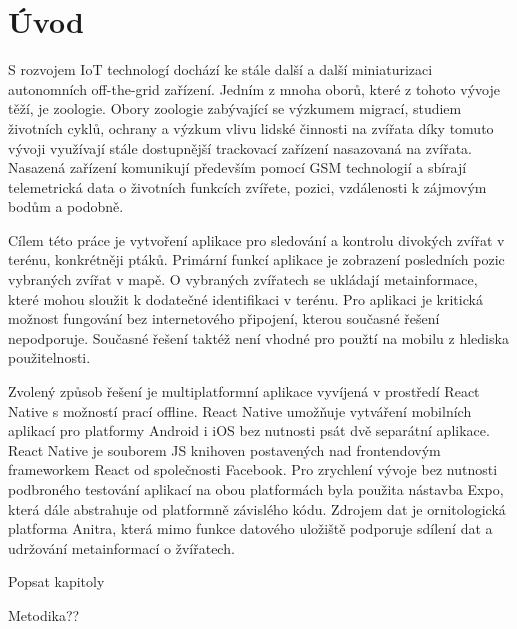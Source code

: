 \chapter*{Úvod}

S rozvojem IoT technologí dochází ke stále další a další miniaturizaci autonomních off-the-grid zařízení. Jedním z mnoha oborů, které z tohoto vývoje těží, je zoologie. Obory zoologie zabývající se výzkumem migrací, studiem životních cyklů, ochrany a výzkum vlivu lidské činnosti na zvířata díky tomuto vývoji využívají stále dostupnější trackovací zařízení nasazovaná na zvířata. Nasazená zařízení komunikují především pomocí GSM technologií a sbírají telemetrická data o životních funkcích zvířete, pozici, vzdálenosti k zájmovým bodům a podobně.


Cílem této práce je vytvoření aplikace pro sledování a kontrolu divokých zvířat v terénu, konkrétněji ptáků. Primární funkcí aplikace je zobrazení posledních pozic vybraných zvířat v mapě. O vybraných zvířatech se ukládají metainformace, které mohou sloužit k dodatečné identifikaci v terénu. Pro aplikaci je kritická možnost fungování bez internetového připojení, kterou současné řešení nepodporuje. Současné řešení taktéž není vhodné pro použtí na mobilu z hlediska použitelnosti.

Zvolený způsob řešení je multiplatformní aplikace vyvíjená v prostředí React Native s možností prací offline. React Native umožňuje vytváření mobilních aplikací pro platformy Android i iOS bez nutnosti psát dvě separátní aplikace. React Native je souborem JS knihoven postavených nad frontendovým frameworkem React od společnosti Facebook. Pro zrychlení vývoje bez nutnosti podbroného testování aplikací na obou platformách byla použita nástavba Expo, která dále abstrahuje od platformně závislého kódu. Zdrojem dat je ornitologická platforma Anitra, která mimo funkce datového uložiště podporuje sdílení dat a udržování metainformací o žvířatech.

Popsat kapitoly

Metodika??



